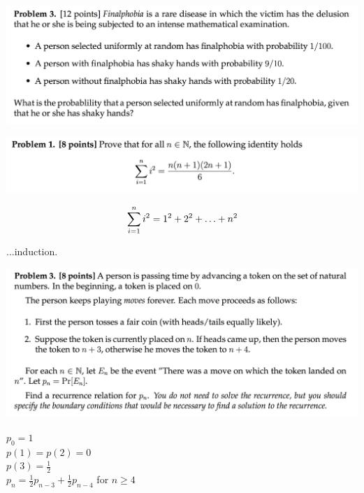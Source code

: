 \documentclass[12pt]{article}
\begin{document}
\begin{mdframed}
\includegraphics[width=400pt]{img/MIT-math-for-cs-2004-3.png}
\end{mdframed}

\newpage
\begin{mdframed}
\includegraphics[width=400pt]{img/MIT-math-for-cs-2006-1.png}
\end{mdframed}
\begin{align*}
  \sum_{i=1}^{n} i^2 = 1^2 + 2^2 + \ldots + n^2
\end{align*}

...induction.

\newpage
\begin{mdframed}
\includegraphics[width=400pt]{img/MIT-math-for-cs-2006-3.png}
\end{mdframed}
$p_0 = 1$\\
$p(1) = p(2) = 0$\\
$p(3) = \frac{1}{2}$\\
$p_n = \frac{1}{2}p_{n-3} + \frac{1}{2}p_{n-4}$ for $n \geq 4$\\
\end{document}
